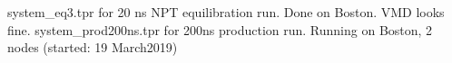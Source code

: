system_eq3.tpr  for 20 ns NPT equilibration run. Done on Boston. VMD looks fine.
system_prod200ns.tpr for 200ns production run. Running on Boston, 2 nodes (started: 19 March2019)

